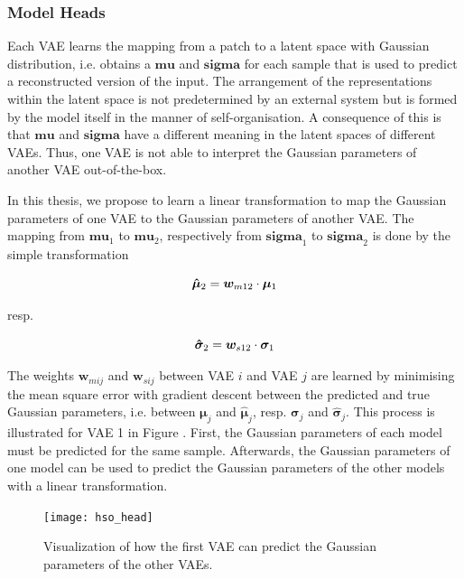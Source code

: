 \subsubsection{Model Heads}
Each VAE learns the mapping from a patch to a latent space with Gaussian distribution, i.e. obtains a $\boldsymbol{mu}$ and $\boldsymbol{sigma}$ for each sample that is used to predict a reconstructed version of the input.
The arrangement of the representations within the latent space is not predetermined by an external system but is formed by the model itself in the manner of self-organisation. A consequence of this is that $\boldsymbol{mu}$ and $\boldsymbol{sigma}$ have a different meaning in the latent spaces of different VAEs. Thus, one VAE is not able to interpret the Gaussian parameters of another VAE out-of-the-box.

In this thesis, we propose to learn a linear transformation to map the Gaussian parameters of one VAE to the Gaussian parameters of another VAE. The mapping from $\boldsymbol{mu}_1$ to $\boldsymbol{mu}_2$, respectively from $\boldsymbol{sigma}_1$ to $\boldsymbol{sigma}_2$ is done by the simple transformation

\begin{equation}\eqlbl{hso_7}
	\boldsymbol{\hat{\mu}}_2 = \boldsymbol{w}_{m12} \cdot \boldsymbol{\mu}_1
\end{equation}

resp.

\begin{equation}\eqlbl{hso_8}
	\boldsymbol{\hat{\sigma}}_2 = \boldsymbol{w}_{s12} \cdot \boldsymbol{\sigma}_1
\end{equation}

The weights $\boldsymbol{w}_{mij}$ and $\boldsymbol{w}_{sij}$ between VAE $i$ and VAE $j$ are learned by minimising the mean square error with gradient descent between the predicted and true Gaussian parameters, i.e. between $\boldsymbol{\mu}_j$ and $\boldsymbol{\hat{\mu}}_j$, resp. $\boldsymbol{\sigma}_j$ and $\boldsymbol{\hat{\sigma}}_j$. This process is illustrated for VAE 1 in Figure . First, the Gaussian parameters of each model must be predicted for the same sample. Afterwards, the Gaussian parameters of one model can be used to predict the Gaussian parameters of the other models with a linear transformation.

\begin{figure}[h]
    \centering
    \texttt{[image: hso\_head]}
    \caption[Prediction of Gaussian parameters of other VAEs]{Visualization of how the first VAE can predict the Gaussian parameters of the other VAEs.}
\end{figure}

